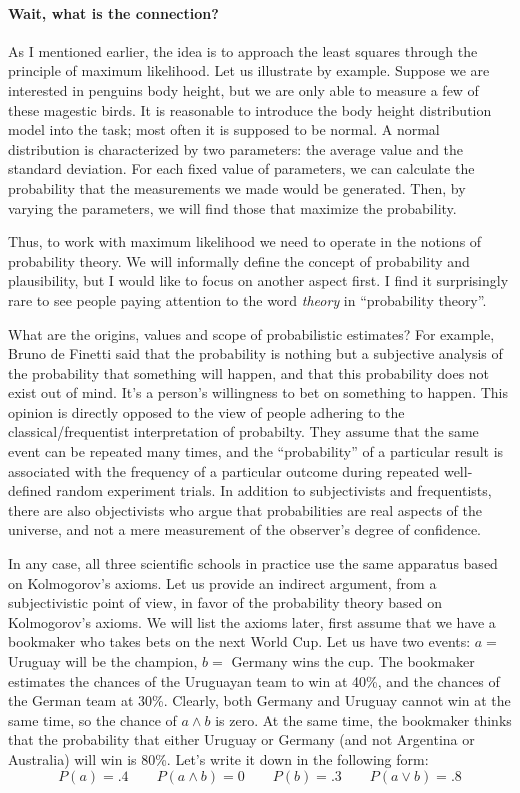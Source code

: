 \documentclass[notitlepage]{report}
\begin{document}
\paragraph*{Wait, what is the connection?}

As I mentioned earlier, the idea is to approach the least squares through the principle of maximum likelihood. 
Let us illustrate by example. 
Suppose we are interested in penguins body height, but we are only able to measure a few of these magestic birds.
It is reasonable to introduce the body height distribution model into the task; most often it is supposed to be normal.
A normal distribution is characterized by two parameters: the average value and the standard deviation.
For each fixed value of parameters, we can calculate the probability that the measurements we made would be generated.
Then, by varying the parameters, we will find those that maximize the probability.

Thus, to work with maximum likelihood we need to operate in the notions of probability theory.
We will informally define the concept of probability and plausibility,
but I would like to focus on another aspect first.
I find it surprisingly rare to see people paying attention to the word \textit{theory} in ``probability theory''.

What are the origins, values and scope of probabilistic estimates? 
For example, Bruno de Finetti said that the probability is nothing but a subjective analysis of the probability that something will happen, 
and that this probability does not exist out of mind. 
It's a person's willingness to bet on something to happen. 
This opinion is directly opposed to the view of people adhering to the classical/frequentist interpretation of probabilty.
They assume that the same event can be repeated many times, and the ``probability'' of a particular result is associated with 
the frequency of a particular outcome during repeated well-defined random experiment trials.
In addition to subjectivists and frequentists, there are also objectivists who argue that probabilities are real aspects of the universe, 
and not a mere measurement of the observer's degree of confidence.

In any case, all three scientific schools in practice use the same apparatus based on Kolmogorov's axioms.
Let us provide an indirect argument, from a subjectivistic point of view, in favor of the probability theory based on Kolmogorov's axioms.
We will list the axioms later, first assume that we have a bookmaker who takes bets on the next World Cup. 
Let us have two events: $a=$ Uruguay will be the champion, $b=$ Germany wins the cup.
The bookmaker estimates the chances of the Uruguayan team to win at 40\%, and the chances of the German team at 30\%.
Clearly, both Germany and Uruguay cannot win at the same time, so the chance of $a\wedge b$ is zero. 
At the same time, the bookmaker thinks that the probability that either Uruguay or Germany (and not Argentina or Australia) will win is 80\%.
Let's write it down in the following form:
$$P(a) = .4  \qquad  P(a\wedge b) = 0 \qquad P(b) = .3 \qquad P(a\vee b) = .8$$
	
\end{document}
